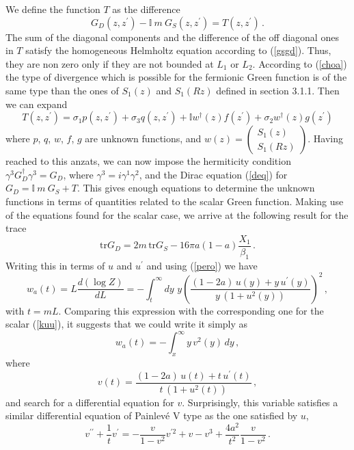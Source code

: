 \documentclass[11pt]{article}
\begin{document}
 We define the function $T$ as the difference
\begin{equation}
G_D(z,z^{\prime})-\mathbb I ~m~G_S(z,z^{\prime})=T(z,z^{\prime})\,.
\end{equation}
The sum of the diagonal components and the difference of the off diagonal ones in $T$ satisfy the homogeneous Helmholtz equation according to (\ref{gsgd}). Thus, they are non zero only if they are not bounded at $L_1$ or $L_2$. According to (\ref{choa}) the type of divergence which is possible for the fermionic Green function is of the same type than the ones of $S_1(z)$ and $S_1(Rz)$ defined in section 3.1.1. Then we can expand 
\begin{equation}
T(z,z^{\prime})=\sigma_1 p(z,z^{\prime})+\sigma_3 q(z,z^{\prime})+\mathbb I w^{\dagger}(z)f(z^{\prime})+\sigma_2 w^{\dagger}(z)g(z^{\prime}) 
\end{equation}
where $p$, $q$, $w$, $f$, $g$ are unknown functions, and $w(z)=\begin{pmatrix}S_1(z)\\S_1(Rz)\end{pmatrix}$.
Having reached to this anzats, we can now impose the hermiticity condition $\gamma^3 G_D^\dagger \gamma^3=G_D$, where $\gamma^3=i \gamma^1 \gamma^2$, and the Dirac equation (\ref{deq}) for $G_D=\mathbb I ~m~G_S+T$. This gives enough equations to determine the unknown functions in terms of quantities related to the scalar Green function. Making use of the equations found for the scalar case, we arrive at the following result for the trace 
\begin{equation}
\textrm{tr}G_D=2 m\, \textrm{tr}G_S -16 \pi a (1-a)\frac{X_1}{\beta_1}\,.
\end{equation} 
Writing this in terms of $u$ and $u^\prime$ and using  (\ref{pero}) we have
\begin{equation}
w_a(t)=L \frac{d(\log Z)}{dL}=-\int_t^\infty dy \,\,y \left( \frac{(1-2a)\,u(y) +y\,u^{\prime}(y)}{y\,(1+u^2(y))}\right)^2\,,\label{pejot}
\end{equation} 
with $t=m L$. Comparing this expression with the corresponding one for the scalar (\ref{kuu}), it suggests that we could write it simply as
\begin{equation}
w_{a }(t)=-\int_{x}^{\infty }y\,v^{2}(y)\,dy \,,  \label{uni}
\end{equation} 
where
\begin{equation}
v(t)=\frac{(1-2a)\,u(t) +t\,u^{\prime}(t)}{t\,(1+u^2(t))}\,,\label{tiro}
\end{equation}
and search for a differential equation for $v$. Surprisingly, this variable satisfies a similar differential equation of Painlev\'e V type as the one satisfied by $u$,   
\begin{equation}
v^{\prime \prime }+\frac{1}{t}v^{\prime }=-\frac{
v}{1-v^{2}} v^{\prime 2}+v-v^{3}+\frac{4 a^{2}}{t^{2}}\frac{v}{1-v^{2}}\,.  \label{q}
\end{equation}
\end{document}

